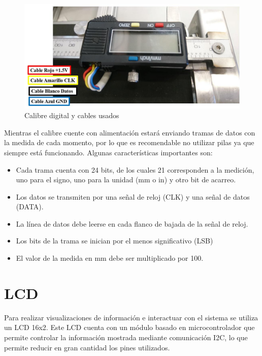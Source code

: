 \begin{figure}[hbtp]
	\centering
	\includegraphics[width=\textwidth]{02-hardware/06-calibrador.png}
	\caption{Calibre digital y cables usados}
	\label{fig:figura26}
	\end{figure}


Mientras el calibre cuente con alimentación estará enviando tramas de
datos con la medida de cada momento, por lo que es recomendable no 
utilizar pilas ya que siempre está funcionando. Algunas características 
importantes son:

\begin{itemize}
    \item Cada trama cuenta con 24 bits, de los cuales 21 corresponden
    a la medición, uno para el signo, uno para la unidad (mm o in) y otro
    bit de acarreo.
    \item Los datos se transmiten por una señal de reloj (CLK) y una señal
    de datos (DATA).
    \item La línea de datos debe leerse en cada flanco de bajada de 
    la señal de reloj.
    \item Los bits de la trama se inician por el menos significativo (LSB)
    \item El valor de la medida en mm debe ser multiplicado por 100.
\end{itemize}

\section{LCD}

Para realizar visualizaciones de información e interactuar con el 
sistema se utiliza un LCD 16x2. Este LCD cuenta con un módulo basado
en microcontrolador que permite controlar la información mostrada mediante
comunicación I2C, lo que permite reducir en gran cantidad los pines utilizados. 

